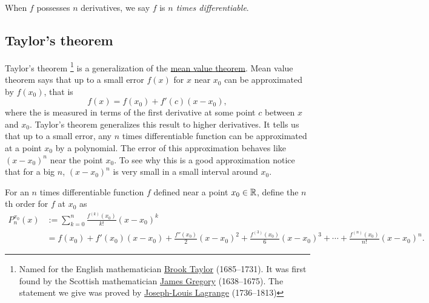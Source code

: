 When $f$ possesses $n$ derivatives, we say $f$ is
\emph{$n$ times differentiable}.

\subsection{Taylor's theorem}

Taylor's theorem%
\footnote{Named for the English mathematician
\href{https://en.wikipedia.org/wiki/Brook_Taylor}{Brook Taylor}
(1685--1731).
It was first found by
the Scottish mathematician
\href{https://en.wikipedia.org/wiki/James_Gregory_(mathematician)}{James Gregory}
(1638--1675).  The statement we give
was proved by
\href{https://en.wikipedia.org/wiki/Lagrange}{Joseph-Louis Lagrange}
(1736--1813)}
is a generalization of the \hyperref[thm:mvt]{mean value theorem}.
Mean value theorem says that up to a small error $f(x)$ for $x$ near $x_0$ can be
approximated by $f(x_0)$, that is
\begin{equation*}
f(x) = f(x_0) + f'(c)(x-x_0),
\end{equation*}
where the  is measured in terms of the first derivative
at some point $c$ between $x$ and $x_0$.
Taylor's theorem generalizes this result to higher derivatives.
It tells us that up to a small error, any $n$
times differentiable function can be approximated at a point $x_0$
by a polynomial.  The
error of this approximation behaves like ${(x-x_0)}^{n}$ near the point $x_0$.
To see why this is a good approximation notice that for a big $n$, 
${(x-x_0)}^n$ is very small in a small interval around $x_0$.

\begin{defn}
For an $n$ times differentiable function $f$ defined near a point $x_0 \in {\mathbb{R}}$, define the
$n$th order \emph{}%
for $f$ at $x_0$ as
\begin{equation*}
\begin{split}
P_n^{x_0}(x)
& :=
\sum_{k=0}^n
\frac{f^{(k)}(x_0)}{k!}{(x-x_0)}^k
\\
& =
f(x_0)
+ f'(x_0)(x-x_0)
+ \frac{f''(x_0)}{2}{(x-x_0)}^2
+ \frac{f^{(3)}(x_0)}{6}{(x-x_0)}^3
+ \cdots
+ \frac{f^{(n)}(x_0)}{n!}{(x-x_0)}^n .
\end{split}
\end{equation*}
\end{defn}

